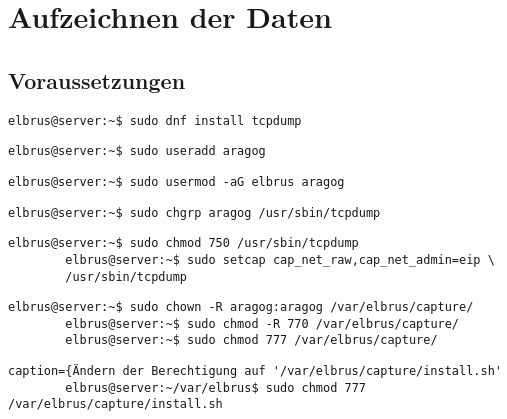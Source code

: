 \documentclass{article}
\begin{document}
	\section{Aufzeichnen der Daten}
	\subsection{Voraussetzungen}
	\lstset{style=commands}
	\begin{lstlisting}[caption={Installieren von 'tcpdump' für das aufzeichnen von Daten.}]
		elbrus@server:~$ sudo dnf install tcpdump
	\end{lstlisting}

	\begin{lstlisting}[caption={Anlegen eines Users der Berechtigungen zum ausführen von 'tcpdump' erhält.}]
		elbrus@server:~$ sudo useradd aragog
	\end{lstlisting}

	\begin{lstlisting}[caption={Hinzufügen von User 'aragog' zu Gruppe 'elbrus'.}]
		elbrus@server:~$ sudo usermod -aG elbrus aragog
	\end{lstlisting}
	
	\begin{lstlisting}[caption={Zuweisen von 'tcpdump' zu der Gruppe 'aragog'.}]
		elbrus@server:~$ sudo chgrp aragog /usr/sbin/tcpdump
	\end{lstlisting}
	
	\begin{lstlisting}[caption={Ändern der Berechtigungen auf 'tcpdump'.}]
		elbrus@server:~$ sudo chmod 750 /usr/sbin/tcpdump
		elbrus@server:~$ sudo setcap cap_net_raw,cap_net_admin=eip \
		/usr/sbin/tcpdump
	\end{lstlisting}

	\begin{lstlisting}[caption={Wechseln des Owners \& der Berechtigung auf '/var/elbrus/capture/'}]
		elbrus@server:~$ sudo chown -R aragog:aragog /var/elbrus/capture/
		elbrus@server:~$ sudo chmod -R 770 /var/elbrus/capture/
		elbrus@server:~$ sudo chmod 777 /var/elbrus/capture/
	\end{lstlisting}

	\begin{lstlisting}caption={Ändern der Berechtigung auf '/var/elbrus/capture/install.sh'
		elbrus@server:~/var/elbrus$ sudo chmod 777 /var/elbrus/capture/install.sh
	\end{lstlisting}
	
\end{document}
